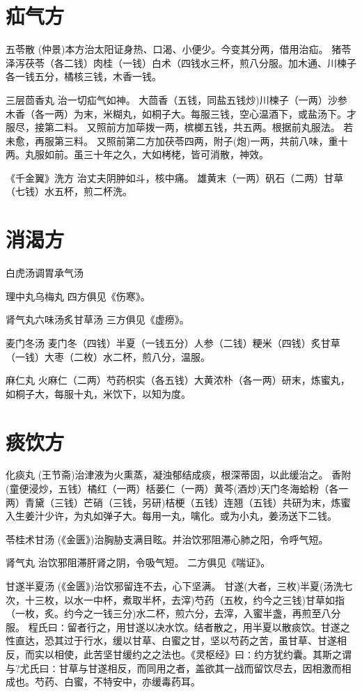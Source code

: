 \documentclass[a4paper,12pt,UTF8,twoside]{ctexbook}
\begin{document}
	
	
	\chapter{疝气方}	
	
	五苓散
	(仲景)本方治太阳证身热、口渴、小便少。今变其分两，借用治疝。
	猪苓泽泻茯苓（各二钱）肉桂（一钱）白术（四钱水三杯，煎八分服。加木通、川楝子各一钱五分，橘核三钱，木香一钱。
	
	三层茴香丸
	治一切疝气如神。
	大茴香（五钱，同盐五钱炒)川楝子（一两）沙参木香（各一两）为末，米糊丸，如桐子大。每服三钱，空心温酒下，或盐汤下。才服尽，接第二料。
	又照前方加荜拨一两，槟榔五钱，共五两。根据前丸服法。
	若未愈，再服第三料。
	又照前第二方加茯苓四两，附子(炮)一两，共前八味，重十两。丸服如前。虽三十年之久，大如栲栳，皆可消散，神效。
	
	《千金翼》洗方
	治丈夫阴肿如斗，核中痛。
	雄黄末（一两）矾石（二两）甘草（七钱）水五杯，煎二杯洗。
	
	

	\chapter{消渴方}
		
	白虎汤调胃承气汤
	
	理中丸乌梅丸
	四方俱见《伤寒》。
	
	肾气丸六味汤炙甘草汤
	三方俱见《虚痨》。
	
	麦门冬汤
	麦门冬（四钱）半夏（一钱五分）人参（二钱）粳米（四钱）炙甘草（一钱）大枣（二枚）水二杯，煎八分，温服。
	
	麻仁丸
	火麻仁（二两）芍药枳实（各五钱）大黄浓朴（各一两）研末，炼蜜丸，如桐子大，每服十丸，米饮下，以知为度。
	
	\chapter{痰饮方}	
	
	化痰丸
	(王节斋)治津液为火熏蒸，凝浊郁结成痰，根深蒂固，以此缓治之。
	香附(童便浸炒，五钱）橘红（一两）栝蒌仁（一两）黄芩(酒炒)天门冬海蛤粉（各一两）青黛（三钱）芒硝（三钱，另研)桔梗（五钱）连翘（五钱）共研为末，炼蜜入生姜汁少许，为丸如弹子大。每用一丸，噙化。或为小丸，姜汤送下二钱。
	
	苓桂术甘汤
	(《金匮》)治胸胁支满目眩。并治饮邪阻滞心肺之阳，令呼气短。
	
	肾气丸
	治饮邪阻滞肝肾之阴，令吸气短。
	二方俱见《喘证》。
	
	甘遂半夏汤
	(《金匮》)治饮邪留连不去，心下坚满。
	甘遂(大者，三枚)半夏(汤洗七次，十三枚，以水一中杯，煮取半杯，去滓)芍药（五枚，约今之三钱)甘草如指（一枚，炙。约今之一钱三分)水二杯，煎六分，去滓，入蜜半盏，再煎至八分服。
	程氏曰∶留者行之，用甘遂以决水饮。结者散之，用半夏以散痰饮。甘遂之性直达，恐其过于行水，缓以甘草、白蜜之甘，坚以芍药之苦，虽甘草、甘遂相反，而实以相使，此苦坚甘缓约之之法也。《灵枢经》曰∶约方犹约囊。其斯之谓与?尤氏曰∶甘草与甘遂相反，而同用之者，盖欲其一战而留饮尽去，因相激而相成也。芍药、白蜜，不特安中，亦缓毒药耳。
	
\end{document}
